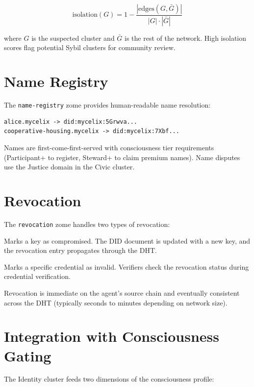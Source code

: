 \documentclass[11pt,twocolumn]{article}
\begin{document}
\begin{equation}
  \text{isolation}(G) = 1 - \frac{|\text{edges}(G, \bar{G})|}{|G| \cdot |\bar{G}|}
\end{equation}

where $G$ is the suspected cluster and $\bar{G}$ is the rest of the network.
High isolation scores flag potential Sybil clusters for community review.

\section{Name Registry}

The \texttt{name-registry} zome provides human-readable name resolution:

\begin{lstlisting}[language={}]
alice.mycelix -> did:mycelix:5Grwva...
cooperative-housing.mycelix -> did:mycelix:7Xbf...
\end{lstlisting}

Names are first-come-first-served with consciousness tier requirements
(Participant+ to register, Steward+ to claim premium names). Name disputes
use the Justice domain in the Civic cluster.

\section{Revocation}

The \texttt{revocation} zome handles two types of revocation:

\begin{description}[nosep]
  \item[Key revocation] Marks a key as compromised. The DID document is updated
    with a new key, and the revocation entry propagates through the DHT.
  \item[Credential revocation] Marks a specific credential as invalid. Verifiers
    check the revocation status during credential verification.
\end{description}

Revocation is immediate on the agent's source chain and eventually consistent
across the DHT (typically seconds to minutes depending on network size).

\section{Integration with Consciousness Gating}

The Identity cluster feeds two dimensions of the consciousness profile:
\end{document}
